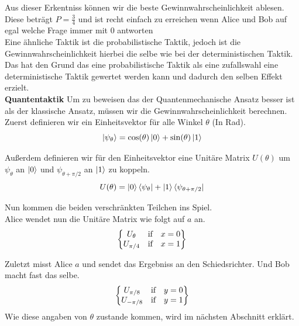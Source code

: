 Aus dieser Erkentniss können wir die beste Gewinnwahrscheinlichkeit ablesen.
Diese beträgt $P = \frac{3}{4}$ und ist recht einfach zu erreichen wenn Alice und Bob auf egal welche Frage immer mit $0$ antworten\\

Eine ähnliche Taktik ist die probabilistische Taktik, jedoch ist die Gewinnwahrscheinlichkeit hierbei die selbe wie bei der deterministischen Taktik.
Das hat den Grund das eine probabilistische Taktik als eine zufallswahl eine deterministische Taktik gewertet werden kann und dadurch den selben Effekt erzielt.\\

\textbf{Quantentaktik}
Um zu beweisen das der Quantenmechanische Ansatz besser ist als der klassische Ansatz, müssen wir die Gewinnwahrscheinlichkeit berechnen.\\

Zuerst definieren wir ein Einheitsvektor für alle Winkel $\theta$ (In Rad).
\begin{equation}
    \ket{\psi_\theta} = \cos(\theta) \ket{0} + \sin(\theta) \ket{1}
\end{equation}

Außerdem definieren wir für den Einheitsvektor eine Unitäre Matrix $U(\theta)$ um $\psi_\theta$ an $\ket{0}$ und $\psi_{\theta+\pi/2}$ an $\ket{1}$ zu koppeln.
\begin{equation}
    U(\theta) = \ket{0}\bra{\psi_\theta} + \ket{1}\bra{\psi_{\theta+\pi/2}}
\end{equation}

Nun kommen die beiden verschränkten Teilchen ins Spiel.\\

Alice wendet nun die Unitäre Matrix wie folgt auf $a$ an.
\begin{equation}
    \begin{Bmatrix}
        U_\theta & \hbox{if} & x = 0 \\
        U_{\pi/4} & \hbox{if} & x = 1
    \end{Bmatrix}
\end{equation}

Zuletzt misst Alice $a$ und sendet das Ergebniss an den Schiedsrichter. Und Bob macht fast das selbe.
\begin{equation}
    \begin{Bmatrix}
        U_{\pi/8} & \hbox{if} & y = 0 \\
        U_{-\pi/8} & \hbox{if} & y = 1
    \end{Bmatrix}
\end{equation}
Wie diese angaben von $\theta$ zustande kommen, wird im nächsten Abschnitt erklärt.\\

